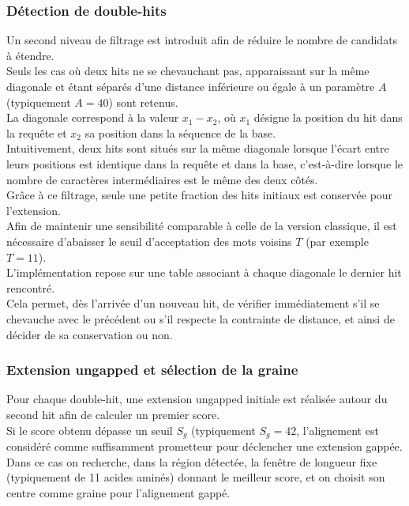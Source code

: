 \documentclass[conference]{IEEEtran}
\begin{document}
\subsubsection{Détection de double-hits}
Un second niveau de filtrage est introduit afin de réduire le nombre de candidats à étendre.\\
Seuls les cas où deux hits ne se chevauchant pas, apparaissant sur la même diagonale et étant séparés d’une distance inférieure ou égale à un paramètre $A$ (typiquement $A = 40$) sont retenus.\\
La diagonale correspond à la valeur $x_1 - x_2$, où $x_1$ désigne la position du hit dans la requête et $x_2$ sa position dans la séquence de la base.\\
Intuitivement, deux hits sont situés sur la même diagonale lorsque l’écart entre leurs positions est identique dans la requête et dans la base, c’est-à-dire lorsque le nombre de caractères intermédiaires est le même des deux côtés.\\
Grâce à ce filtrage, seule une petite fraction des hits initiaux est conservée pour l’extension.\\
Afin de maintenir une sensibilité comparable à celle de la version classique, il est nécessaire d’abaisser le seuil d’acceptation des mots voisins $T$ (par exemple $T = 11$).\\
L’implémentation repose sur une table associant à chaque diagonale le dernier hit rencontré.\\
Cela permet, dès l’arrivée d’un nouveau hit, de vérifier immédiatement s’il se chevauche avec le précédent ou s’il respecte la contrainte de distance, et ainsi de décider de sa conservation ou non.

\subsubsection{Extension ungapped et sélection de la graine}
Pour chaque double-hit, une extension ungapped initiale est réalisée autour du second hit afin de calculer un premier score.\\
Si le score obtenu dépasse un seuil $S_g$ (typiquement $S_g = 42$, l’alignement est considéré comme suffisamment prometteur pour déclencher une extension gappée. \\
Dans ce cas on recherche, dans la région détectée, la fenêtre de longueur fixe (typiquement de 11 acides aminés) donnant le meilleur score, et on choisit son centre comme graine pour l’alignement gappé.
\end{document}
